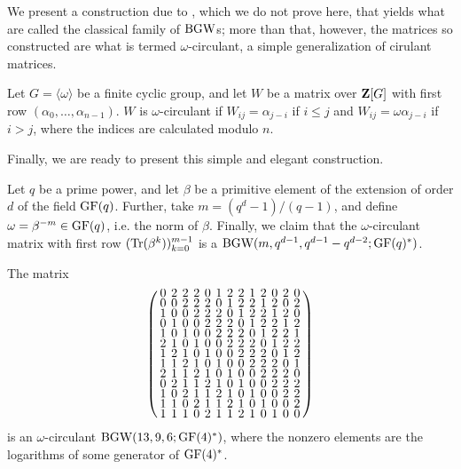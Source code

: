 \documentclass[../../../main]{subfiles}
\begin{document}
 We present a construction due to \cite{jungnickel-tonchev-perfect-codes-2}, which we do not prove here, that yields what are called the classical family of $\text{BGW}$s; more than that, however, the matrices so constructed are what is termed $\omega$-circulant, a simple generalization of cirulant matrices.
 
 \begin{defin}
 Let $G = \langle \omega \rangle$ be a finite cyclic group, and let $W$ be a matrix over $\mathbf{Z}[G]$ with first row $(\alpha_0, \dots, \alpha_{n-1})$. $W$ is $\omega$-circulant if $W_{ij} = \alpha_{j-i}$ if $i \leq j$ and $W_{ij} = \omega\alpha_{j-i}$ if $i > j$, where the indices are calculated modulo $n$.
 \end{defin}
 
 Finally, we are ready to present this simple and elegant construction. 
 
 \begin{prop}\label{trace-construction}
  Let $q$ be a prime power, and let $\beta$ be a primitive element of the extension of order $d$ of the field $\text{GF}(q)$. Further, take $m = (q^d-1)/(q-1)$, and define $\omega = \beta^{-m} \in \text{GF}(q)$, i.e. the norm of $\beta$. Finally, we claim that the $\omega$-circulant matrix with first row $(\text{Tr}(\beta^k))_{k=0}^{m-1}$ is a $\text{BGW}(m,q^{d-1},q^{d-1}-q^{d-2}; \text{GF}(q)^*)$.
 \end{prop}
 
 \begin{ex}
  The matrix
  \begin{equation}
   \arraycolsep=2.0pt\def\arraystretch{0.5}
   \left(
   \begin{array}{ccccccccccccc}
0&2&2&2&0&1&2&2&1&2&0&2&0\\
0&0&2&2&2&0&1&2&2&1&2&0&2\\
1&0&0&2&2&2&0&1&2&2&1&2&0\\
0&1&0&0&2&2&2&0&1&2&2&1&2\\
1&0&1&0&0&2&2&2&0&1&2&2&1\\
2&1&0&1&0&0&2&2&2&0&1&2&2\\
1&2&1&0&1&0&0&2&2&2&0&1&2\\
1&1&2&1&0&1&0&0&2&2&2&0&1\\
2&1&1&2&1&0&1&0&0&2&2&2&0\\
0&2&1&1&2&1&0&1&0&0&2&2&2\\
1&0&2&1&1&2&1&0&1&0&0&2&2\\
1&1&0&2&1&1&2&1&0&1&0&0&2\\
1&1&1&0&2&1&1&2&1&0&1&0&0
   \end{array}
   \right)
  \end{equation}
is an $\omega$-circulant $\text{BGW}(13,9,6; \text{GF}(4)^*)$, where the nonzero elements are the logarithms of some generator of $\text{GF}(4)^*$.
 \end{ex}
\end{document}
